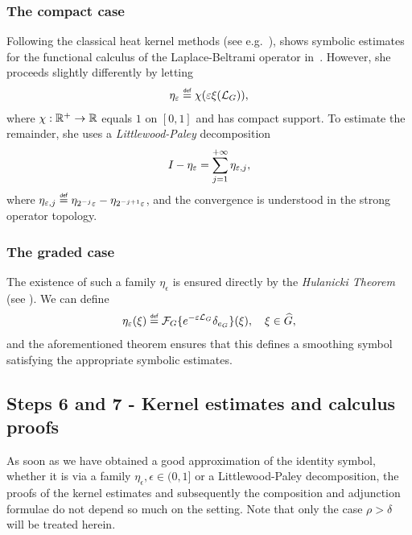 \subsubsection{The compact case}

Following the classical heat kernel methods (see e.g.~\cite{FurioliMelziVeneruso06,VaropoulosSaloffCosteCoulhon92}),
\citeauthor{Fischer2015} shows symbolic estimates for the functional calculus of the Laplace-Beltrami operator in~\cite{Fischer2015}.
However, she proceeds slightly differently by letting
\begin{align*}
    \eta_\epsilon
    \defeq \chi(\epsilon \xi(\Laplacian [\Group])),
\end{align*}
where $\chi : \mathbb{R}^+ \to \mathbb{R}$ equals $1$ on $[0, 1]$ and has compact support.
To estimate the remainder,
she uses a \emph{Littlewood-Paley} decomposition
\begin{align*}
    {I_{}} - \eta_\varepsilon = \sum_{j = 1}^{+\infty} \eta_{\varepsilon, j},
\end{align*}
where $\eta_{\epsilon, j} \defeq \eta_{2^{-j} \epsilon} - \eta_{2^{-j + 1} \epsilon}$,
and the convergence is understood in the strong operator topology.

\subsubsection{The graded case}

The existence of such a family $\eta_\epsilon$ is ensured directly by the \emph{Hulanicki Theorem} (see \cite[Theorem 4.5.1]{FischerRuzhansky16}).
We can define
\begin{align*}
    \eta_\epsilon(\xi) \defeq \Fourier \{\e^{-\epsilon \Laplacian} \delta_{e_\Group}\}(\xi),
    \quad \xi \in \dualGroup \Group,
\end{align*}
and the aforementioned theorem ensures that this defines a smoothing symbol satisfying the appropriate symbolic estimates.

\subsection*{Steps 6 and 7 - Kernel estimates and calculus proofs}

As soon as we have obtained a good approximation of the identity symbol,
whether it is via a family $\eta_\epsilon, \epsilon \in (0, 1]$
or a Littlewood-Paley decomposition,
the proofs of the kernel estimates and subsequently the composition and adjunction formulae do not depend so much on the setting.
Note that only the case $\rho > \delta$ will be treated herein.

